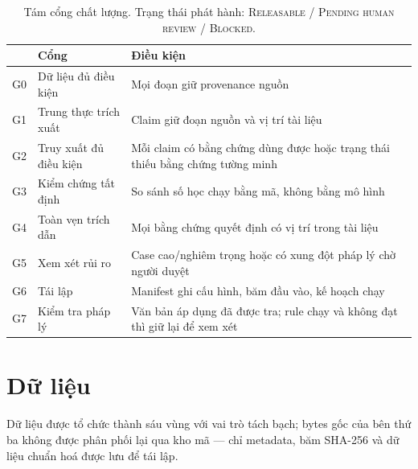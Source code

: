 \documentclass[11pt,a4paper]{article}
\newcommand{\status}[1]{\textsc{#1}}
\begin{document}
\begin{table}[!htbp]\small
\begin{tabularx}{\linewidth}{l L{3.4cm} X}
\toprule
& \textbf{Cổng} & \textbf{Điều kiện} \\
\midrule
G0 & Dữ liệu đủ điều kiện & Mọi đoạn giữ provenance nguồn \\
G1 & Trung thực trích xuất & Claim giữ đoạn nguồn và vị trí tài liệu \\
G2 & Truy xuất đủ điều kiện & Mỗi claim có bằng chứng dùng được hoặc trạng thái thiếu bằng chứng tường minh \\
G3 & Kiểm chứng tất định & So sánh số học chạy bằng mã, không bằng mô hình \\
G4 & Toàn vẹn trích dẫn & Mọi bằng chứng quyết định có vị trí trong tài liệu \\
G5 & Xem xét rủi ro & Case cao/nghiêm trọng hoặc có xung đột pháp lý chờ người duyệt \\
G6 & Tái lập & Manifest ghi cấu hình, băm đầu vào, kế hoạch chạy \\
G7 & Kiểm tra pháp lý & Văn bản áp dụng đã được tra; rule chạy và không đạt thì giữ lại để xem xét \\
\bottomrule
\end{tabularx}
\caption{Tám cổng chất lượng. Trạng thái phát hành: \status{Releasable} / \status{Pending human review} / \status{Blocked}.}
\end{table}

\section{Dữ liệu}

Dữ liệu được tổ chức thành sáu vùng với vai trò tách bạch; bytes gốc của bên thứ ba không được phân phối lại qua kho mã — chỉ metadata, băm SHA-256 và dữ liệu chuẩn hoá được lưu để tái lập.
\end{document}
